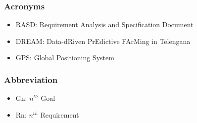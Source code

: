 \subsubsection{Acronyms}
\begin{itemize}
	\item RASD: Requirement Analysis and Specification Document
	\item DREAM: Data-dRiven PrEdictive FArMing in
Telengana
	\item GPS: Global Positioning System
\end{itemize}

\subsubsection{Abbreviation}
\begin{itemize}
	\item Gn: $n^{th}$ Goal
	\item Rn: $n^{th}$ Requirement
\end{itemize}